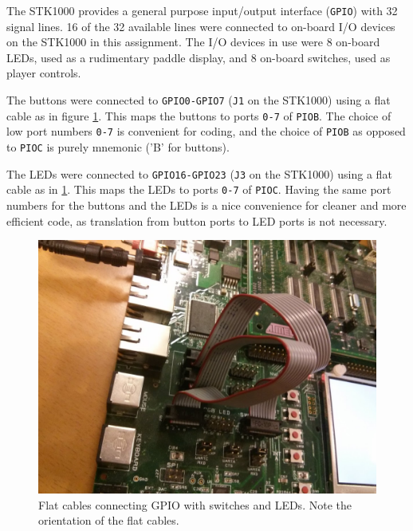 The STK1000 provides a general purpose input/output interface (\texttt{GPIO}) with 32 signal lines.
16 of the 32 available lines were connected to on-board I/O devices on the STK1000 in this assignment.
The I/O devices in use were 8 on-board LEDs, used as a rudimentary paddle display, and 8 on-board switches, used as player controls.

The buttons were connected to \texttt{GPIO0-GPIO7} (\texttt{J1} on the STK1000) using a flat cable as in figure \ref{flat-cable-image}. This maps the buttons to ports \texttt{0-7} of \texttt{PIOB}.
The choice of low port numbers \texttt{0-7} is convenient for coding, and the choice of \texttt{PIOB} as opposed to \texttt{PIOC} is purely mnemonic ('B' for buttons).

The LEDs were connected to \texttt{GPIO16-GPIO23} (\texttt{J3} on the STK1000) using a flat cable as in \ref{flat-cable-image}. This maps the LEDs to ports \texttt{0-7} of \texttt{PIOC}.
Having the same port numbers for the buttons and the LEDs is a nice convenience for cleaner and more efficient code, as translation from button ports to LED ports is not necessary.

\begin{figure}
\includegraphics[width = \textwidth]{description-and-methodology/flat-cable-image.jpg}
\caption{Flat cables connecting GPIO with switches and LEDs. Note the orientation of the flat cables.}
\label{flat-cable-image}
\end{figure}
